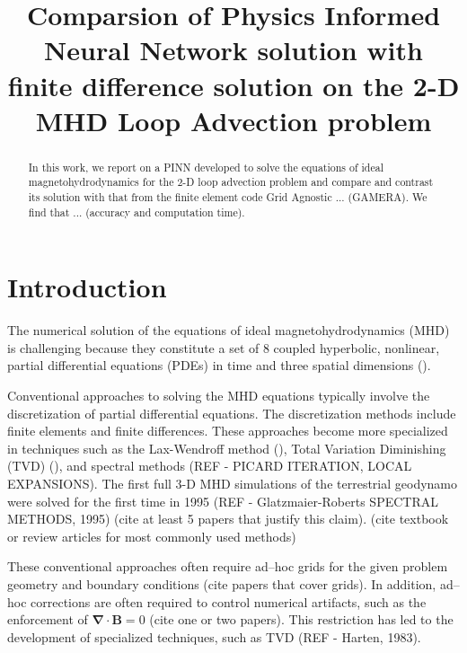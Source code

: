\documentclass[]{article}
\title{Comparsion of Physics Informed Neural Network solution with finite difference solution on the 2-D MHD Loop Advection problem}
\begin{document}
\begin{abstract}
In this work, we report on a PINN developed to solve the equations of ideal magnetohydrodynamics for the 2-D loop advection problem and compare and contrast its solution with that from the finite element code Grid Agnostic ... (GAMERA). We find that ... (accuracy and computation time). 
\end{abstract}

\section{Introduction}

The numerical solution of the equations of ideal magnetohydrodynamics (MHD) is challenging because they constitute a set of 8 coupled hyperbolic, nonlinear, partial differential equations (PDEs) in time and three spatial dimensions (\cite{Goedbloed2019}). 


Conventional approaches to solving the MHD equations typically involve the discretization of partial differential equations. The discretization methods include finite elements and finite differences. These approaches become more specialized in techniques such as the Lax-Wendroff method (\cite{Lax1960}), Total Variation Diminishing (TVD) (\cite{Harten1983}), and spectral methods (REF - PICARD ITERATION, LOCAL EXPANSIONS). The first full 3-D MHD simulations of the terrestrial geodynamo were solved for the first time in 1995 (REF - Glatzmaier-Roberts SPECTRAL METHODS, 1995) (cite at least 5 papers that justify this claim).  (cite textbook or review articles for most commonly used methods)

These conventional approaches often require ad--hoc grids for the given problem geometry and boundary conditions (cite papers that cover grids). In addition, ad--hoc corrections are often required to control numerical artifacts, such as the enforcement of $\mathbf{\nabla}\cdot \mathbf{B}=0$ (cite one or two papers). This restriction has led to the development of specialized techniques, such as TVD (REF - Harten, 1983).
\end{document}
